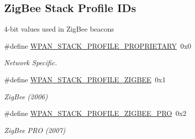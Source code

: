 \subsection*{Zig\+Bee Stack Profile I\+Ds}
\label{_amgrp53635a0a6c11f45c3462a5d59d0da424}%
4-\/bit values used in Zig\+Bee beacons \begin{DoxyCompactItemize}
\item 
\mbox{\label{group__wpan__aps_ga6c74dccd9d25158e8fae5f405708a412}} 
\#define \hyperlink{group__wpan__aps_ga6c74dccd9d25158e8fae5f405708a412}{W\+P\+A\+N\+\_\+\+S\+T\+A\+C\+K\+\_\+\+P\+R\+O\+F\+I\+L\+E\+\_\+\+P\+R\+O\+P\+R\+I\+E\+T\+A\+RY}~0x0
\begin{DoxyCompactList}\small\item\em Network Specific. \end{DoxyCompactList}\item 
\mbox{\label{group__wpan__aps_ga7836a9ee2baaed24f5f4f8368aee7ef4}} 
\#define \hyperlink{group__wpan__aps_ga7836a9ee2baaed24f5f4f8368aee7ef4}{W\+P\+A\+N\+\_\+\+S\+T\+A\+C\+K\+\_\+\+P\+R\+O\+F\+I\+L\+E\+\_\+\+Z\+I\+G\+B\+EE}~0x1
\begin{DoxyCompactList}\small\item\em Zig\+Bee (2006) \end{DoxyCompactList}\item 
\mbox{\label{group__wpan__aps_ga9f0ebaaaa46a7bdaa646050b927d5dbb}} 
\#define \hyperlink{group__wpan__aps_ga9f0ebaaaa46a7bdaa646050b927d5dbb}{W\+P\+A\+N\+\_\+\+S\+T\+A\+C\+K\+\_\+\+P\+R\+O\+F\+I\+L\+E\+\_\+\+Z\+I\+G\+B\+E\+E\+\_\+\+P\+RO}~0x2
\begin{DoxyCompactList}\small\item\em Zig\+Bee P\+RO (2007) \end{DoxyCompactList}\end{DoxyCompactItemize}
